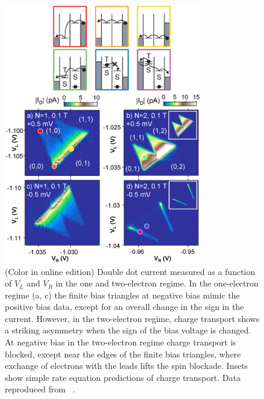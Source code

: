 \documentclass[rmp,twocolumn,aps]{revtex4}
\begin{document}
\begin{figure}[htb]
\begin{center}
\includegraphics[width=8.6cm]{hanson_fig34.eps}
\end{center}
\caption{(Color in online edition) Double dot current measured as a
function of $V_L$ and $V_R$ in the one and two-electron regime. In
the one-electron regime (a, c) the finite bias triangles at
negative bias mimic the positive bias data, except for an overall
change in the sign in the current. However, in the two-electron
regime, charge transport shows a striking asymmetry when the sign
of the bias voltage is changed. At negative bias in the
two-electron regime charge transport is blocked, except near the
edges of the finite bias triangles, where exchange of electrons
with the leads lifts the spin blockade. Insets show simple rate
equation predictions of charge transport. Data
reproduced from ~\textcite{JohnsonSpinBlock}.}%
\label{Fig:Johnson:Transport}
\end{figure}
\end{document}
